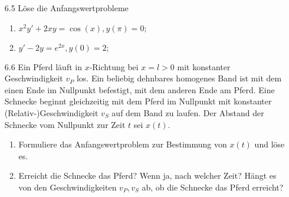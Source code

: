 \documentclass{HM}
\begin{document}
\begin{enumerate}
		\item [6.5] Löse die Anfangswertprobleme
		\begin{enumerate}
			\item $x^2y'+2xy = \cos(x), y(\pi)=0;$
			\item $y' - 2y = e^{2x}, y(0)=2;$
		\end{enumerate}
		
		\item [6.6]  Ein Pferd läuft in $x$-Richtung bei $x=l>0$ mit konstanter Geschwindigkeit $v_P$ los. Ein beliebig dehnbares homogenes Band ist mit dem einen Ende im Nullpunkt befestigt, mit dem anderen Ende am Pferd. Eine Schnecke beginnt gleichzeitig mit dem Pferd im Nullpunkt mit konstanter (Relativ-)Geschwindigkeit $v_S$ auf dem Band zu laufen. Der Abstand der Schnecke vom Nullpunkt zur Zeit $t$ sei $x(t)$.
		\begin{enumerate}
			\item Formuliere das Anfangswertproblem zur Bestimmung von $x(t)$ und löse es.
			\item Erreicht die Schnecke das Pferd? Wenn ja, nach welcher Zeit? Hängt es von den Geschwindigkeiten $v_P, v_S$ ab, ob die Schnecke das Pferd erreicht?
		\end{enumerate}
	\end{enumerate}
\end{document}
